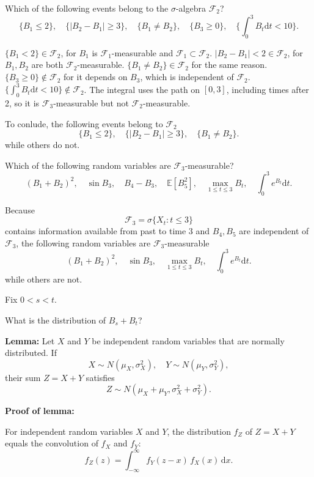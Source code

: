 \documentclass{MFM-hw} %
\date{Sep 15, 2026}
\newcommand{\dd}{\,\mathrm{d}}
\begin{document}
\maketitle
\HWproblem
\HWsubproblem
Which of the following events belong to the $\sigma$-algebra $\mathcal{F}_2$?
\[
    \{B_1 \leq 2\},\quad \{|B_2 - B_1| \geq 3\}, \quad \{B_1 \neq B_2\}, \quad\{B_3 \geq 0\}, \quad \{\int_0^3 B_t \mathrm{d}t < 10\}.
\]

$\{B_1 < 2\} \in \mathcal{F}_2$, for $B_1$ is $\mathcal{F}_1$-measurable and $\mathcal{F}_1 \subset \mathcal{F}_2$. ${|B_2 - B_1| < 2} \in \mathcal{F}_2$, for $B_1, B_2$ are both $\mathcal{F}_2$-measurable. $\{B_1 \neq B_2\} \in \mathcal{F}_2$ for the same reason.$\{B_3 \geq 0\} \not \in \mathcal{F}_2$ for it depends on $B_3$, which is independent of $\mathcal{F}_2$. $\{\int_0^3 B_t \mathrm{d}t < 10\} \not \in \mathcal{F}_2$. The integral uses the path on $[0,3]$, including times after 2, so it is $\mathcal{F}_3$-measurable but not $\mathcal{F}_2$-measurable.

To conlude, the following events belong to $\mathcal{F}_2$
\[
\{B_1 \leq 2\},\quad \{|B_2 - B_1| \geq 3\}, \quad \{B_1 \neq B_2\}.
\]
while others do not.

\HWsubproblem
Which of the following random variables are $\mathcal{F}_3$-measurable?
\[
    (B_1 + B_2)^2, \quad \sin B_3, \quad B_4 - B_3, \quad \mathbb{E}[B_5^2], \quad \max\limits_{1\leq t\leq 3}B_t, \quad \int_0^3 e^{B_t} \mathrm{d}t.
\]

Because
\[
\mathcal{F}_3 = \sigma\{X_t : t \leq 3\} 
\]
contains information available from past to time 3 and $B_4, B_5$ are independent of $\mathcal{F}_3$, the following random variables are  $\mathcal{F}_3$-measurable
\[
    (B_1 + B_2)^2, \quad \sin B_3, \quad \max\limits_{1\leq t\leq 3}B_t, \quad \int_0^3 e^{B_t} \mathrm{d}t.
\]
while others are not.

\HWproblem
Fix $0<s<t$.

\HWsubproblem
What is the distribution of $B_s + B_t$?

\textbf{Lemma:} Let $X$ and $Y$ be independent random variables that are normally distributed. If
\[
X \sim N(\mu_X, \sigma^2_X), \quad Y \sim N(\mu_Y, \sigma^2_Y),
\]
their sum $Z = X + Y$ satisfies
\[
Z \sim N(\mu_X+\mu_Y, \sigma^2_X+\sigma^2_Y).
\]

\textbf{Proof of lemma:} 

For independent random variables $X$ and $Y$, the distribution $f_Z$ of $Z = X + Y$ equals the
convolution of $f_X$ and $f_Y$:
\begin{equation*}
f_Z(z) = \int_{-\infty}^{\infty} f_Y(z - x)\, f_X(x) \dd x .
\end{equation*}
\end{document}

